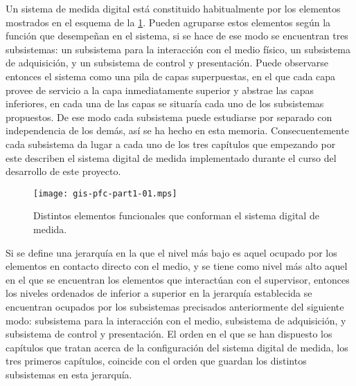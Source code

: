Un sistema de medida digital está constituido habitualmente por los
elementos mostrados en el esquema de la \cref{fig:digmeasstm}. Pueden
agruparse estos elementos según la función que desempeñan en el sistema, si
se hace de ese modo se encuentran tres subsistemas: un subsistema para la
interacción con el medio físico, un subsistema de adquisición, y un
subsistema de control y presentación. Puede observarse entonces el sistema
como una pila de capas superpuestas, en el que cada capa provee de servicio
a la capa inmediatamente superior y abstrae las capas inferiores, en cada
una de las capas se situaría cada uno de los subsistemas propuestos. De ese
modo cada subsistema puede estudiarse por separado con independencia de los
demás, así se ha hecho en esta memoria. Consecuentemente cada subsistema da
lugar a cada uno de los tres capítulos que empezando por este describen el
sistema digital de medida implementado durante el curso del desarrollo de
este proyecto.

\begin{figure}
	\begin{center}
		\texttt{[image: gis-pfc-part1-01.mps]}
	\end{center}
	\captionsetup{listformat=romanos, labelformat=romanos}
	\caption[Sistema de medida digital]{Distintos elementos funcionales
	que conforman el sistema digital de medida.}
	\label{fig:digmeasstm}
\end{figure}

Si se define una jerarquía en la que el nivel más bajo es aquel ocupado por
los elementos en contacto directo con el medio, y se tiene como nivel más
alto aquel en el que se encuentran los elementos que interactúan con el
supervisor, entonces los niveles ordenados de inferior a superior en la
jerarquía establecida se encuentran ocupados por los subsistemas precisados
anteriormente del siguiente modo: subsistema para la interacción con el
medio, subsistema de adquisición, y subsistema de control y presentación.
El orden en el que se han dispuesto los capítulos que tratan acerca de la
configuración del sistema digital de medida, los tres primeros capítulos,
coincide con el orden que guardan los distintos subsistemas en esta
jerarquía.
